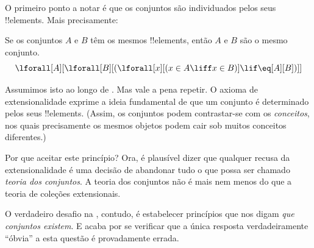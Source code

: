 \documentclass[../../../include/open-logic-section]{subfiles}
\begin{document}

O primeiro ponto a notar é que os conjuntos são individuados pelos seus
!!{element}s. Mais precisamente:

\begin{axiom}[Extensionalidade]
Se os conjuntos $A$ e $B$ têm os mesmos !!{element}s, então $A$ e $B$ são
o mesmo conjunto.
\[
  \lforall[A][\lforall[B][(\lforall[x][(x \in A \liff x \in B)] \lif
  \eq[A][B])]]
\]
\end{axiom}

Assumimos isto ao longo de . Mas vale a pena
repetir. O axioma de extensionalidade exprime a ideia fundamental de que um
conjunto é determinado pelos seus !!{element}s. (Assim, os conjuntos podem contrastar-se com os
\emph{conceitos}, nos quais precisamente os mesmos objetos podem cair sob
muitos conceitos diferentes.) 

Por que aceitar este princípio? Ora, é plausível dizer que qualquer
recusa da extensionalidade é uma decisão de abandonar tudo o que possa
ser chamado \emph{teoria dos conjuntos}. A teoria dos conjuntos não é mais nem menos do que
a teoria de coleções extensionais. 

O verdadeiro desafio na , contudo, é estabelecer
princípios que nos digam \emph{que conjuntos existem}. E acaba por se verificar que a única resposta verdadeiramente ``óbvia'' a esta questão é
provadamente errada.
\end{document}
